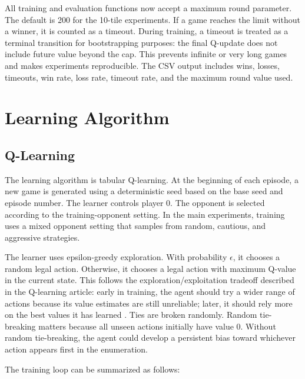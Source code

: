 \documentclass[conference]{IEEEtran}
\begin{document}
All training and evaluation functions now accept a maximum round parameter. The
default is 200 for the 10-tile experiments. If a game reaches the limit without a
winner, it is counted as a timeout. During training, a timeout is treated as a
terminal transition for bootstrapping purposes: the final Q-update does not include
future value beyond the cap. This prevents infinite or very long games and makes
experiments reproducible. The CSV output includes wins, losses, timeouts, win
rate, loss rate, timeout rate, and the maximum round value used.

\section{Learning Algorithm}

\subsection{Q-Learning}

The learning algorithm is tabular Q-learning. At the beginning of each episode, a
new game is generated using a deterministic seed based on the base seed and episode
number. The learner controls player 0. The opponent is selected according to the
training-opponent setting. In the main experiments, training uses a mixed opponent
setting that samples from random, cautious, and aggressive strategies.

The learner uses epsilon-greedy exploration. With probability $\epsilon$, it
chooses a random legal action. Otherwise, it chooses a legal action with maximum
Q-value in the current state. This follows the exploration/exploitation tradeoff
described in the Q-learning article: early in training, the agent should try a
wider range of actions because its value estimates are still unreliable; later, it
should rely more on the best values it has learned \cite{sanchoQLearning}. Ties
are broken randomly. Random tie-breaking matters because all unseen actions
initially have value 0. Without random tie-breaking, the agent could develop a
persistent bias toward whichever action appears first in the enumeration.

The training loop can be summarized as follows:
\end{document}
